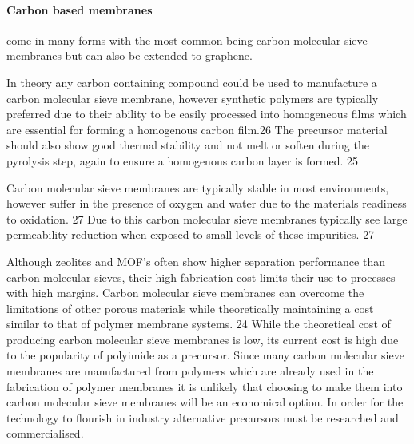 \paragraph{Carbon based membranes} come in many forms with the most common being carbon 
molecular sieve membranes but can also be extended to graphene. 

In theory any carbon containing compound could be used to manufacture a carbon molecular 
sieve membrane, however synthetic polymers are typically preferred due to their ability to 
be easily processed into homogeneous films which are essential for forming a homogenous 
carbon film.26  The precursor material should also show good thermal stability and not melt 
or soften during the pyrolysis step, again to ensure a homogenous carbon layer is formed. 25

Carbon molecular sieve membranes are typically stable in most environments, however suffer 
in the presence of oxygen and water due to the materials readiness to oxidation. 27 Due to 
this carbon molecular sieve membranes typically see large permeability reduction when exposed 
to small levels of these impurities. 27

Although zeolites and MOF’s often show higher separation performance than carbon molecular 
sieves, their high fabrication cost limits their use to processes with high margins. 
Carbon molecular sieve membranes can overcome the limitations of other porous materials 
while theoretically maintaining a cost similar to that of polymer membrane systems. 24 
While the theoretical cost of producing carbon molecular sieve membranes is low, its current 
cost is high due to the popularity of polyimide as a precursor. Since many carbon molecular 
sieve membranes are manufactured from polymers which are already used in the fabrication of 
polymer membranes it is unlikely that choosing to make them into carbon molecular sieve 
membranes will be an economical option. In order for the technology to flourish in industry 
alternative precursors must be researched and commercialised. 

